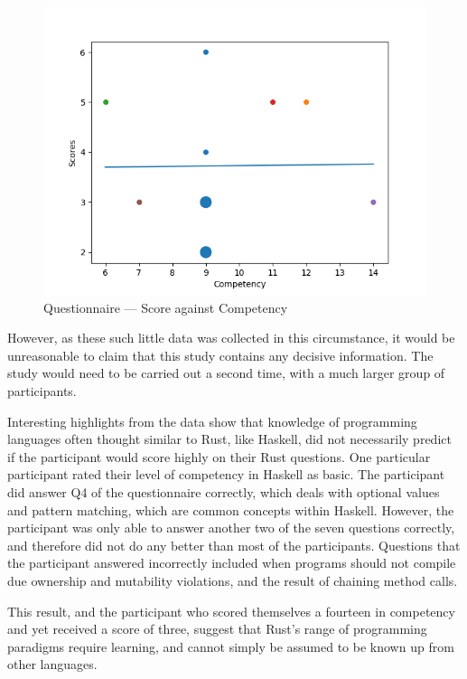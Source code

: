 \begin{figure}[h]
\centering
\includegraphics[width=.8\linewidth]{figs/questions/scatter.png}
\caption{Questionnaire --- Score against Competency}\label{fig:questions}
\end{figure}

However, as these such little data was collected in this circumstance, it would be unreasonable to claim that this study contains any decisive information. The study would need to be carried out a second time, with a much larger group of participants.

Interesting highlights from the data show that knowledge of programming languages often thought similar to Rust, like Haskell, did not necessarily predict if the participant would score highly on their Rust questions. One particular participant rated their level of competency in Haskell as basic. The participant did answer Q4 of the questionnaire correctly, which deals with optional values and pattern matching, which are common concepts within Haskell. However, the participant was only able to answer another two of the seven questions correctly, and therefore did not do any better than most of the participants. Questions that the participant answered incorrectly included when programs should not compile due ownership and mutability violations, and the result of chaining method calls.

This result, and the participant who scored themselves a fourteen in competency and yet received a score of three, suggest that Rust's range of programming paradigms require learning, and cannot simply be assumed to be known up from other languages.
